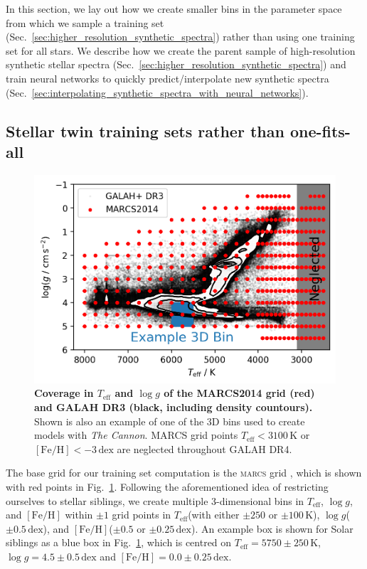 \documentclass[
  journal=pasa,
  manuscript=research-paper, %
  year=2024,
  volume=37
]{cup-journal}
\newcommand{\Teff}{$T_\mathrm{eff}$\xspace}
\newcommand{\logg}{$\log g$\xspace}
\newcommand{\feh}{$\mathrm{[Fe/H]}$\xspace}
\newcommand{\TheCannon}{\textit{The Cannon}\xspace}
\newcommand{\marcs}{\textsc{marcs}\xspace}
\newcommand{\dex}{\,\mathrm{dex}}	%
\newcommand{\K}{\,\mathrm{K}}	%
\begin{document}
In this section, we lay out how we create smaller bins in the parameter space from which we sample a training set (Sec.~\ref{sec:higher_resolution_synthetic_spectra}) rather than using one training set for all stars. We describe how we create the parent sample of high-resolution synthetic stellar spectra (Sec.~\ref{sec:higher_resolution_synthetic_spectra}) and train neural networks to quickly predict/interpolate new synthetic spectra (Sec.~\ref{sec:interpolating_synthetic_spectra_with_neural_networks}).

\subsection{Stellar twin training sets rather than one-fits-all}
\label{sec:spectrum_grid}

\begin{figure}[ht]
 \centering
 \includegraphics[width=\textwidth]{figures/teff_logg_grid_coverage.png}
 \caption{\textbf{Coverage in \Teff and \logg of the MARCS2014 grid (red) and GALAH DR3 (black, including density countours).} Shown is also an example of one of the 3D bins used to create models with \TheCannon. MARCS grid points \Teff$ < 3100\K$ or \feh$<-3\dex$ are neglected throughout GALAH DR4.}
 \label{fig:teff_logg_grid_coverage}
\end{figure}

The base grid for our training set computation is the \marcs grid \citep{Gustafsson2008}, which is shown with red points in Fig.~\ref{fig:teff_logg_grid_coverage}. Following the aforementioned idea of restricting ourselves to stellar siblings, we create multiple 3-dimensional bins in \Teff, \logg, and \feh within $\pm 1$ grid points in \Teff (with either $\pm 250$ or $\pm 100\K$), \logg ($\pm 0.5\dex$), and \feh ($\pm 0.5$ or $\pm 0.25\dex $). An example box is shown for Solar siblings as a blue box in Fig.~\ref{fig:teff_logg_grid_coverage}, which is centred on $T_\text{eff} = 5750\pm250\K$, $\log g = 4.5\pm0.5\dex$ and $\mathrm{[Fe/H]} = 0.0\pm0.25\dex$.
\end{document}
